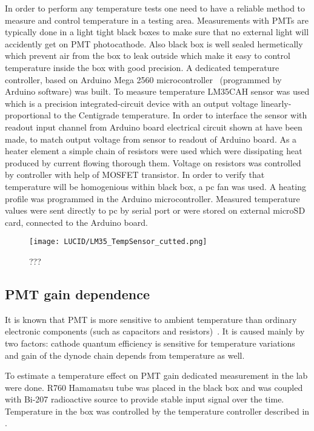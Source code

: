 In order to perform any temperature tests one need to have a reliable method to measure and control temperature in a testing area.
Measurements with PMTs are typically done in a light tight black boxes to make sure that no external light will accidently get on PMT photocathode.
Also black box is well sealed hermetically which prevent air from the box to leak outside which make it easy to control temperature inside the box with good 
precision.
A dedicated temperature controller, based on Arduino Mega 2560 microcontroller~\cite{arduino} (programmed by Arduino software) was built.
To measure temperature LM35CAH sensor was used which is a precision integrated-circuit device with an output voltage linearly-proportional to the Centigrade 
temperature.
In order to interface the sensor with readout input channel from Arduino board electrical circuit shown at  have been made, 
to match output voltage from sensor to readout of Arduino board.
As a heater element a simple chain of resistors were used which were dissipating heat produced by current flowing thorough them. 
Voltage on resistors was controlled by controller with help of MOSFET transistor. In order to verify that temperature will be homogenious within black box,
a pc fan was used. A heating profile was programmed in the Arduino microcontroller.
Measured temperature values were sent directly to pc by serial port or were stored on external microSD card, connected to the Arduino board.
 
 \begin{figure}
\centering
\texttt{[image: LUCID/LM35\_TempSensor\_cutted.png]}
\caption{???}
\label{fig:tempReadOutCircuit}
\end{figure}

 
\subsection{PMT gain dependence}
\label{subsec:pmtGainTempDep}

It is known that PMT is more sensitive to ambient temperature than ordinary 
electronic components (such as capacitors and resistors)~\cite{hamamatsu}.
It is caused mainly by two factors: cathode quantum efficiency is sensitive for 
temperature variations and gain of the dynode chain depends from temperature as well.

To estimate a temperature effect on PMT gain dedicated measurement in the lab were done. 
R760 Hamamatsu tube was placed in the black box and was coupled with Bi-207 radioactive source
to provide stable input signal over the time. Temperature in the box was controlled by the temperature controller described in 
.

